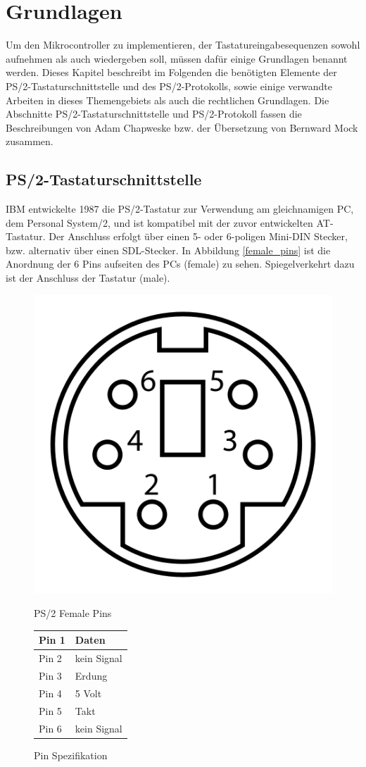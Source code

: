 \chapter{Grundlagen}
Um den Mikrocontroller zu implementieren, der Tastatureingabesequenzen sowohl aufnehmen als auch wiedergeben soll, müssen dafür einige Grundlagen benannt werden. Dieses Kapitel beschreibt im Folgenden die benötigten Elemente der PS/2-Tastaturschnittstelle und des PS/2-Protokolls, sowie einige verwandte Arbeiten in dieses Themengebiets als auch die rechtlichen Grundlagen. Die Abschnitte PS/2-Tastaturschnittstelle und PS/2-Protokoll fassen die Beschreibungen von Adam Chapweske \cite{chapweske} bzw. der Übersetzung von Bernward Mock \cite{mock} zusammen.



\section{PS/2-Tastaturschnittstelle}
IBM entwickelte 1987 die PS/2-Tastatur zur Verwendung am gleichnamigen PC, dem Personal System/2, und ist kompatibel mit der zuvor entwickelten AT-Tastatur. Der Anschluss erfolgt über einen 5- oder 6-poligen Mini-DIN Stecker, bzw. alternativ über einen SDL-Stecker. In Abbildung \ref{female_pins} \cite{female_pins} ist die Anordnung der 6 Pins aufseiten des PCs (female) zu sehen. Spiegelverkehrt dazu ist der Anschluss der Tastatur (male).

\begin{figure}
  \centering
  \begin{minipage}{0.45\textwidth}
    \centering
    \includegraphics[width=0.48\linewidth]{images/female_pins.png}
    \caption{PS/2 Female Pins}
    \label{female_pins}
  \end{minipage}
  \begin{minipage}{0.45\textwidth}
    \centering
    \begin{tabular}{|l|l|} \hline
      Pin 1 & Daten \\ \hline
      Pin 2 & kein Signal \\ \hline
      Pin 3 & Erdung \\ \hline
      Pin 4 & 5 Volt \\ \hline
      Pin 5 & Takt \\ \hline
      Pin 6 & kein Signal \\ \hline
    \end{tabular}
    \caption{Pin Spezifikation}
    \label{pin_specification}
  \end{minipage}
\end{figure}

